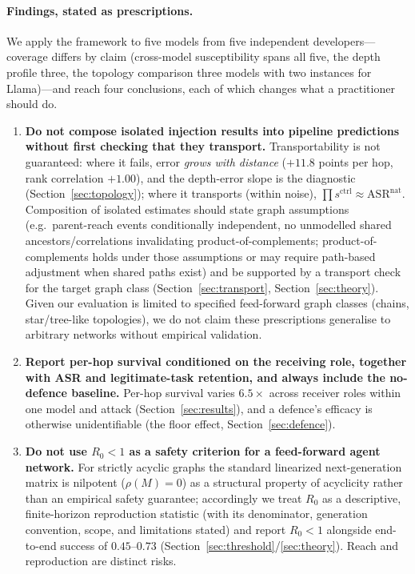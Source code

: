 \documentclass[sigconf,anonymous]{aamas}
\begin{document}
\paragraph{Findings, stated as prescriptions.} We apply the framework to five models
from five independent developers---coverage differs by claim (cross-model
susceptibility spans all five, the depth profile three, the topology comparison three
models with two instances for Llama)---and reach four conclusions, each of which
changes what a practitioner should do.
\label{sec:intro-prescriptions}

\begin{enumerate}
\item \textbf{Do not compose isolated injection results into pipeline
predictions without first checking that they transport.} Transportability is not guaranteed: where it fails, error \emph{grows with distance} ($+11.8$ points per hop, rank correlation $+1.00$), and the depth-error slope is the diagnostic (Section~\ref{sec:topology}); where it transports (within noise), $\prod s^{\mathrm{ctrl}} \approx \mathrm{ASR}^{\mathrm{nat}}$. Composition of isolated estimates should state graph assumptions (e.g.\ parent-reach events conditionally independent, no unmodelled shared ancestors/correlations invalidating product-of-complements; product-of-complements holds under those assumptions or may require path-based adjustment when shared paths exist) and be supported by a transport check for the target graph class (Section~\ref{sec:transport}, Section~\ref{sec:theory}). Given our evaluation is limited to specified feed-forward graph classes (chains, star/tree-like topologies), we do not claim these prescriptions generalise to arbitrary networks without empirical validation.
\item \textbf{Report per-hop survival conditioned on the receiving role, together
with ASR and legitimate-task retention, and always include the no-defence
baseline.} Per-hop survival varies $6.5\times$ across receiver roles within one
model and attack (Section~\ref{sec:results}), and a defence's efficacy is otherwise
unidentifiable (the floor effect, Section~\ref{sec:defence}).
\item \textbf{Do not use $R_0 < 1$ as a safety criterion for a feed-forward agent
network.} For strictly acyclic graphs the standard linearized next-generation matrix is nilpotent ($\rho(M)=0$) as a structural property of acyclicity rather than an empirical safety guarantee; accordingly we treat $R_0$ as a descriptive, finite-horizon reproduction statistic (with its denominator, generation convention, scope, and limitations stated) and report $R_0<1$ alongside end-to-end success of $0.45$--$0.73$ (Section~\ref{sec:threshold}/\ref{sec:theory}). Reach and reproduction are distinct risks.

\end{enumerate}
\end{document}
